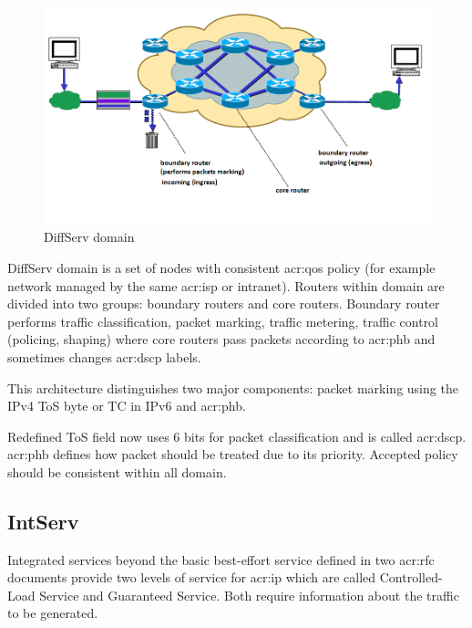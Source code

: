 \documentclass[11pt,openany]{book}
\begin{document}
        \begin{figure}[h]
          \begin{center}
            \includegraphics[width=.7\textwidth]{img/qos/diffserv.png}
          \end{center}


          \caption{DiffServ domain \cite{qos2}}
        \end{figure}

        DiffServ domain is a set of nodes with consistent \gls{acr:qos} policy (for example network managed by the same
        \gls{acr:isp} or intranet). Routers within domain are divided into two groups: boundary routers and core
        routers. Boundary router performs traffic classification, packet marking, traffic metering, traffic control
        (policing, shaping) where core routers pass packets according to \gls{acr:phb} and sometimes changes
        \gls{acr:dscp} labels. \cite{qos2}

        This architecture distinguishes two major components: packet marking using the IPv4 ToS byte or TC in IPv6 and
        \gls{acr:phb}.

        \medskip

        Redefined ToS field now uses 6 bits for packet classification and is called \gls{acr:dscp}. \gls{acr:phb}
        defines how packet should be treated due to its priority. Accepted policy should be consistent within all
        domain.


      \subsection{IntServ}

        Integrated services beyond the basic best-effort service defined in two \gls{acr:rfc} documents provide two
        levels of service for \gls{acr:ip} which are called Controlled-Load Service and Guaranteed Service. Both require
        information about the traffic to be generated. 
\end{document}
